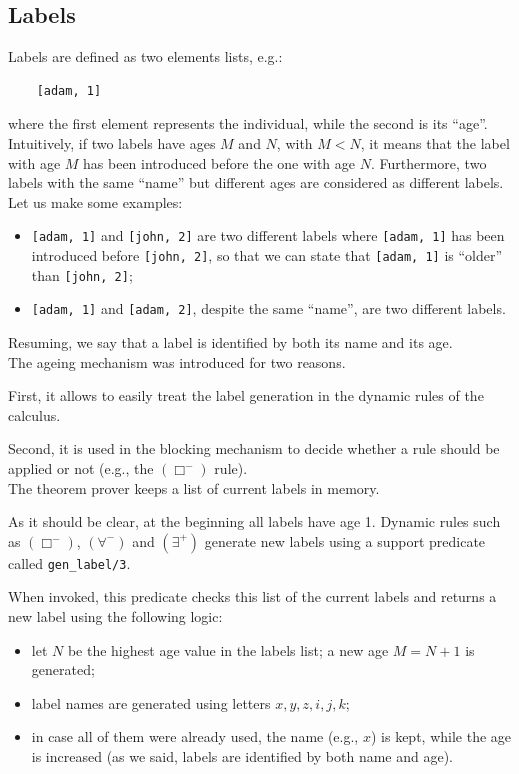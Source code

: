 \documentclass[a4paper, 11pt, oneside]{duthesis}
\newcommand{\perogni} {\forall}
\newcommand{\esiste} {\exists}
\begin{document}
\newpage

\subsection{Labels}\label{proog_labels}
Labels are defined as two elements lists, e.g.:
\begin{verbatim}
    [adam, 1]
\end{verbatim}
where the first element represents the individual, while the second is its ``age''.
Intuitively, if two labels have ages $M$ and $N$, with $M < N$, it means that the label with age $M$ has been introduced before the one with age $N$.
Furthermore, two labels with the same ``name'' but different ages are considered as different labels.\\

Let us make some examples:
\begin{itemize}
\item \texttt{[adam, 1]} and \texttt{[john, 2]} are two different labels where \texttt{[adam, 1]} has been introduced before \texttt{[john, 2]}, so that we can state that \texttt{[adam, 1]} is ``older'' than \texttt{[john, 2]};

\item \texttt{[adam, 1]} and \texttt{[adam, 2]}, despite the same ``name'', are two different labels.
\end{itemize}
Resuming, we say that a label is identified by both its name and its age.\\

The ageing mechanism was introduced for two reasons.

First, it allows to easily treat the label generation in the dynamic rules of the calculus.

Second, it is used in the blocking mechanism to decide whether a rule should be applied or not (e.g., the $(\Box^-)$ rule).\\

The theorem prover keeps a list of current labels in memory.

As it should be clear, at the beginning all labels have age 1. Dynamic rules such as $(\Box^-)$, $(\perogni^-)$ and $(\esiste^+)$ generate new labels using a support predicate called \texttt{gen\_label/3}.


When invoked, this predicate checks this list of the current labels and returns a new label using the following logic:
\begin{itemize}
\item let $N$ be the highest age value in the labels list; a new age $M = N + 1$ is generated;
\item label names are generated using letters $x,y,z,i,j,k$;
\item in case all of them were already used, the name (e.g., $x$) is kept, while the age is increased (as we said, labels are identified by both name and age).
\end{itemize}
\end{document}
